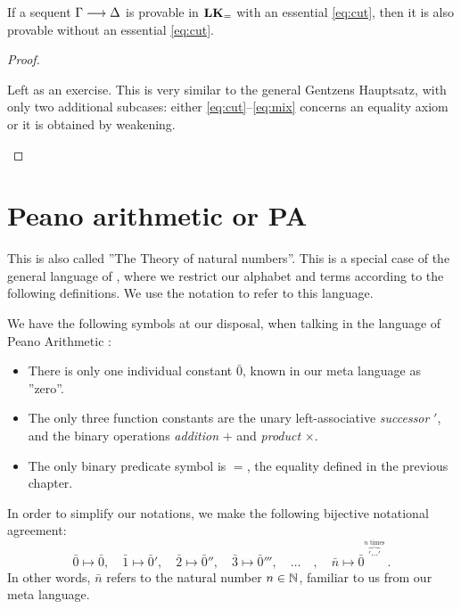 \documentclass[11pt,a4paper]{article}
\begin{document}
\begin{theorem}[\eqref{eq:cut}-elimination in \(\LK_=\)]%
    \label{the:cut-elimination in LK=}
    If a sequent \(\Gamma\longrightarrow\Delta\) is provable in \(\LK_=\) with an essential
    \eqref{eq:cut}, then it is also provable without an essential \eqref{eq:cut}.
\end{theorem}

\begin{proof}
    \begin{exercise}[7.6]\label{exe:7.6}
        Left as an exercise. This is very similar to the general
        Gentzens Hauptsatz, with only two additional subcases:
        either \eqref{eq:cut}--\eqref{eq:mix} concerns an equality
        axiom or it is obtained by weakening.
    \end{exercise}
\end{proof}

\section{Peano arithmetic or PA}

This is also called ''The Theory of natural numbers''.
This is a special case of the general language of \LK{},
where we restrict our alphabet and terms according to the following
definitions. We use the notation \LN{} to refer to this language.

\begin{definition}[Alphabet of \PA{}]\label{def:alphabet of peano arithmetic}
    We have the following symbols at our disposal,
    when talking in the language of Peano Arithmetic \PA:
    \begin{itemize}
        \item
            There is only one individual constant \(\bar0\),
            known in our meta language as ''zero''.
        \item
            The only three function constants are the unary left-associative
            \emph{successor} \('\), and the binary operations
            \emph{addition} \(+\) and \emph{product} \(\times\).
        \item
            The only binary predicate symbol is \(=\),
            the equality defined in the previous chapter.
    \end{itemize}
\end{definition}

\begin{definition}[Numerals]\label{def:numerals}
    In order to simplify our notations,
    we make the following bijective notational agreement:
    \begin{equation*}
        \bar0\mapsto\bar0,\quad
        \bar1\mapsto\bar0',\quad
        \bar2\mapsto\bar0'',\quad
        \bar3\mapsto\bar0''',\quad
        \ldots\quad,\quad
        \bar{n}\mapsto\bar0^{\overbrace{\prime\cdots\prime}^{n\text{ times}}}\,.
    \end{equation*}
    In other words, \(\bar{n}\) refers to the natural number \(n\in\mathbb{N}\),
    familiar to us from our meta language.
\end{definition}
\end{document}
